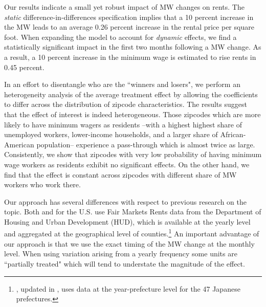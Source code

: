 Our results indicate a small yet robust impact of MW changes on rents. The \textit{static} 
difference-in-differences specification implies that a 10 percent increase in the MW leads to 
an average 0.26 percent increase in the rental price per square foot. When expanding the model 
to account for \textit{dynamic} effects, we find a statistically significant impact in the 
first two months following a MW change. As a result, a 10 percent increase in the minimum 
wage is estimated to rise rents in 0.45 percent. 

In an effort to disentangle who are the ``winners and losers", we perform an heterogeneity 
analysis of the average treatment effect by allowing the coefficients to differ across the 
distribution of zipcode characteristics. The results suggest that the effect of interest is 
indeed heterogeneous. Those zipcodes which are more likely to have minimum wagers as residents 
--with a highest highest share of unemployed workers, lower-income households, and a larger 
share of African-American population-- experience a pass-through which is almost twice as 
large. Consistently, we show that zipcodes with very low probability of having minimum wage 
workers as residents exhibit no significant effects. On the other hand, we find that the 
effect is constant across zipcodes with different share of MW workers who work there.

Our approach has several differences with respect to previous research on the topic. Both 
\textcite{Tidemann2018} and \textcite{Yamagishi2019} for the U.S. use Fair Markets Rents data 
from the Department of Housing and Urban Development (HUD), which is available at the yearly 
level and aggregated at the geographical level of counties.\footnote{\textcite{Yamagishi2019}, 
	updated in \textcite{Yamagishi2020}, uses data at the year-prefecture level for the 47 
	Japanese prefectures.} 
An important advantage of our approach is that we use the exact timing of the MW change at 
the monthly level. When using variation arising from a yearly frequency some units are 
``partially treated" which will tend to understate the magnitude of the effect. 


